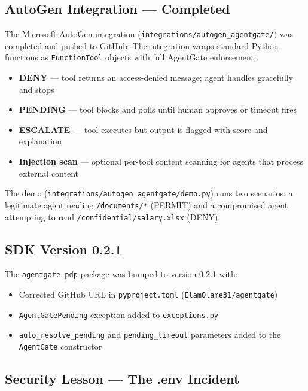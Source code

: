 \documentclass[12pt, a4paper]{article}
\begin{document}
\subsection{AutoGen Integration — Completed}

The Microsoft AutoGen integration (\texttt{integrations/autogen\_agentgate/})
was completed and pushed to GitHub. The integration wraps standard Python
functions as \texttt{FunctionTool} objects with full AgentGate enforcement:

\begin{itemize}[noitemsep]
  \item \textbf{DENY} --- tool returns an access-denied message; agent handles
    gracefully and stops
  \item \textbf{PENDING} --- tool blocks and polls until human approves or
    timeout fires
  \item \textbf{ESCALATE} --- tool executes but output is flagged with score
    and explanation
  \item \textbf{Injection scan} --- optional per-tool content scanning for
    agents that process external content
\end{itemize}

The demo (\texttt{integrations/autogen\_agentgate/demo.py}) runs two scenarios:
a legitimate agent reading \texttt{/documents/*} (PERMIT) and a compromised
agent attempting to read \texttt{/confidential/salary.xlsx} (DENY).

\subsection{SDK Version 0.2.1}

The \texttt{agentgate-pdp} package was bumped to version 0.2.1 with:
\begin{itemize}[noitemsep]
  \item Corrected GitHub URL in \texttt{pyproject.toml}
    (\texttt{ElamOlame31/agentgate})
  \item \texttt{AgentGatePending} exception added to \texttt{exceptions.py}
  \item \texttt{auto\_resolve\_pending} and \texttt{pending\_timeout}
    parameters added to the \texttt{AgentGate} constructor
\end{itemize}

\subsection{Security Lesson — The .env Incident}
\end{document}

